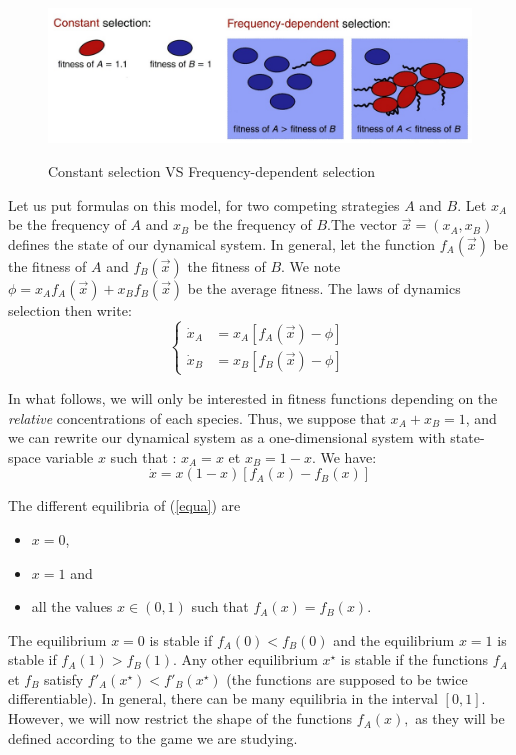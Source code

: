 \begin{figure}[hbtp] \
\centering
\includegraphics[scale=0.6]{im1.jpg}
\caption{Constant selection VS Frequency-dependent selection}
\label{frequency}
\end{figure}
Let us put formulas on this model, for two competing strategies $A$ and $B.$ Let  $x_A$ be the frequency of $A$ and $x_B$ be the frequency of $B.$The vector $\overrightarrow{x} = (x_A,x_B)$ defines the state of our dynamical system. In general, let the function $f_A(\overrightarrow{x})$ be the fitness of $A$ and $f_B(\overrightarrow{x})$ the fitness of $B.$ We note $\phi = x_A f_A(\overrightarrow{x})+ x_B f_B(\overrightarrow{x})$ be the average fitness. The laws of dynamics selection then write:
\begin{equation}
\begin{cases} 
\dot{x}_A &= x_A \left[ f_A(\overrightarrow{x})-\phi \right] \\
\dot{x}_B &= x_B \left[ f_B(\overrightarrow{x})-\phi \right] \
\end{cases}
\label{syst}
\end{equation}

In what follows, we will only be interested in fitness functions depending on the \emph{relative} concentrations of each species.  Thus, we suppose that $x_A + x_B = 1$, and we can rewrite our dynamical system as a one-dimensional system with state-space variable $x$ such that : $x_A = x$ et $x_B = 1-x$. We have:
\begin{equation}
\dot{x} = x(1-x) \left[ f_A(x) - f_B(x) \right] \label{equa}
\end{equation}

The different equilibria of (\ref{equa}) are
\begin{itemize}
\item $x=0$, \item $x=1$ and \item all the values $x \in (0,1)$ such that $f_A(x) = f_B(x)$.\end{itemize} The equilibrium $x=0$ is stable if $f_A(0) < f_B(0)$ and the equilibrium $x=1$ is stable if $f_A(1) > f_B(1)$. Any other equilibrium $x^{\star}$ is stable if the functions $f_A$ et $f_B$ satisfy $f'_A(x^{\star}) < f'_B(x^{\star})$ (the functions are supposed to be twice differentiable). In general, there can be many equilibria in the interval $\left[ 0,1 \right].$ However, we will now restrict the shape of the functions $f_A(x),$ as they will be defined according to the game we are studying.

